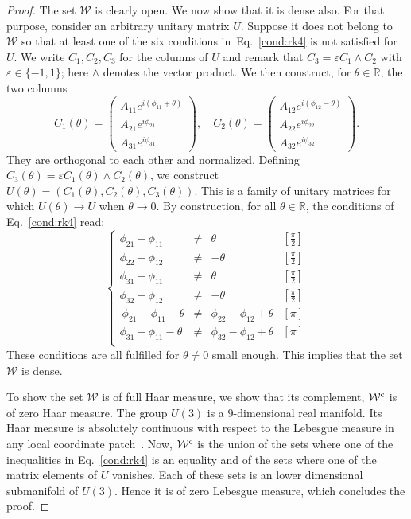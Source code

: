 \documentclass[a4paper, notitlepage, 11pt]{article}
\numberwithin{equation}{section}
\newcommand{\red}[1]{\textcolor{red}{#1}}
\newcommand{\mcl}[1]{\mathcal{#1}}
\newcommand{\R}{\mathbb{R}}
\renewcommand{\epsilon}{\varepsilon}
\begin{document}
\begin{proof}
The set $\mathcal W$ is clearly open.
We now show that it is dense {also}. For that purpose, consider an arbitrary unitary matrix $U$. Suppose it does not belong to $\mathcal W$ so that at least one  of the six conditions in~Eq.~\eqref{cond:rk4} is not satisfied for $U$. We write $C_1, C_2, C_3$ for the columns of $U$ and remark that $C_{3} = \epsilon C_{1}\wedge C_{2}$ with $\epsilon\in \{-1,1\}$; here $\wedge$ {denotes}  the vector product. We then construct, for $\theta\in\R$, the two columns
$$
C_{1}(\theta)=\begin{pmatrix} A_{11}e^{i(\phi_{11}+\theta)} \\ A_{21}e^{i\phi_{21}} \\ A_{31}e^{i\phi_{31}}\end{pmatrix}, \quad C_{2}(\theta)=\begin{pmatrix} A_{12}e^{i(\phi_{12}-\theta)} \\ A_{22}e^{i\phi_{22}} \\ A_{32}e^{i\phi_{32}}\end{pmatrix}.
$$
They are orthogonal to each other and normalized. Defining $C_{3}(\theta) = \epsilon C_{1}(\theta)\wedge C_{2}(\theta)$, we construct  $U(\theta) = (C_{1}(\theta),C_{2}(\theta), C_{3}(\theta))$. This is a family of unitary matrices for which $U(\theta) \to U$ when $\theta \to 0$. By construction, for all $\theta\in\R$, the conditions of Eq.~\eqref{cond:rk4} read:
\[
\left\{\begin{array}{rclc}
\phi_{21}-\phi_{11}  &\neq & \theta & [\frac{\pi}{2}] \\
\phi_{22}-\phi_{12}  &\neq &-\theta &[\frac{\pi}{2}] \\
\phi_{31}-\phi_{11}  & \neq& \theta& [\frac{\pi}{2}] \\
\phi_{32}-\phi_{12}  &\neq &-\theta& [\frac{\pi}{2}] \\\
\phi_{21}-\phi_{11} - \theta &\neq &\phi_{22} - \phi_{12}+\theta& [\pi] \\
\phi_{31}-\phi_{11}-\theta &\neq &\phi_{32}- \phi_{12}+\theta &[\pi] \\
\end{array}\right. 
\]
 {These conditions}   are all fulfilled for $\theta\not=0$ small enough.
This implies that the set $\mathcal W$ is dense.  

To show the set $\mcl{W}$ is of full Haar measure, we show that its complement, $\mcl{W}^{\textrm c}$ is of zero Haar measure. The group $U(3)$ is a $9$-dimensional real manifold. Its Haar measure is absolutely continuous with respect to the Lebesgue measure in any local coordinate patch~\cite{folland2016}. %
Now, $\mcl{W}^{\textrm c}$ is the union of the sets where one of the inequalities in Eq.~\eqref{cond:rk4} is an equality and of the sets where one of the matrix elements of $U$ vanishes. Each of these sets is an lower dimensional submanifold of $U(3)$. Hence it is of zero Lebesgue measure, which concludes the proof.  
\end{proof}
\end{document}
